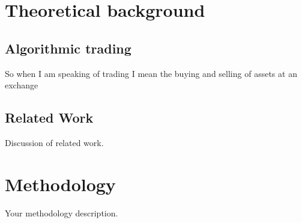 \documentclass[12pt]{article}
\begin{document}
\newpage

\section{Theoretical background}
\subsection{Algorithmic trading}
So when I am speaking of trading I mean the buying and selling of assets at an exchange





\newpage
\subsection{Related Work}
Discussion of related work.


\newpage
\section{Methodology}
Your methodology description.



\newpage
\end{document}
